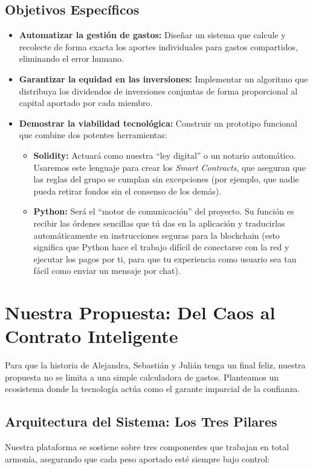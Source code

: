 \documentclass[12pt,a4paper]{article}
\begin{document}
\subsection*{Objetivos Específicos}
\begin{itemize}
    \item \textbf{Automatizar la gestión de gastos:} Diseñar un sistema que calcule y recolecte de forma exacta los aportes individuales para gastos compartidos, eliminando el error humano.
    \item \textbf{Garantizar la equidad en las inversiones:} Implementar un algoritmo que distribuya los dividendos de inversiones conjuntas de forma proporcional al capital aportado por cada miembro.
    \item \textbf{Demostrar la viabilidad tecnológica:} Construir un prototipo funcional que combine dos potentes herramientas: 
    \begin{itemize}
        \item \textbf{Solidity:} Actuará como nuestra ``ley digital'' o un notario automático. Usaremos este lenguaje para crear los \textit{Smart Contracts}, que aseguran que las reglas del grupo se cumplan sin excepciones (por ejemplo, que nadie pueda retirar fondos sin el consenso de los demás).
        \item \textbf{Python:} Será el ``motor de comunicación'' del proyecto. Su función es recibir las órdenes sencillas que tú das en la aplicación y traducirlas automáticamente en instrucciones seguras para la blockchain (esto significa que Python hace el trabajo difícil de conectarse con la red y ejecutar los pagos por ti, para que tu experiencia como usuario sea tan fácil como enviar un mensaje por chat).
    \end{itemize}
\end{itemize}

\section*{Nuestra Propuesta: Del Caos al Contrato Inteligente}

Para que la historia de Alejandra, Sebastián y Julián tenga un final feliz, nuestra propuesta no se limita a una simple calculadora de gastos. Planteamos un ecosistema donde la tecnología actúa como el garante imparcial de la confianza. 

\subsection*{Arquitectura del Sistema: Los Tres Pilares}
Nuestra plataforma se sostiene sobre tres componentes que trabajan en total armonía, asegurando que cada peso aportado esté siempre bajo control:
\end{document}
